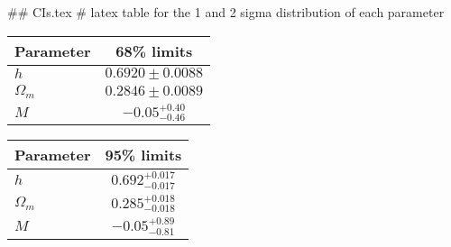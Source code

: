 ## CIs.tex
# latex table for the 1 and 2 sigma distribution of each parameter

\begin{tabular} { l  c}
 Parameter &  68\% limits\\
\hline
{\boldmath$h              $} & $0.6920\pm 0.0088          $\\
{\boldmath$\Omega_m       $} & $0.2846\pm 0.0089          $\\
{\boldmath$M              $} & $-0.05^{+0.40}_{-0.46}     $\\
\hline
\end{tabular}

\begin{tabular} { l  c}
 Parameter &  95\% limits\\
\hline
{\boldmath$h              $} & $0.692^{+0.017}_{-0.017}   $\\
{\boldmath$\Omega_m       $} & $0.285^{+0.018}_{-0.018}   $\\
{\boldmath$M              $} & $-0.05^{+0.89}_{-0.81}     $\\
\hline
\end{tabular}
